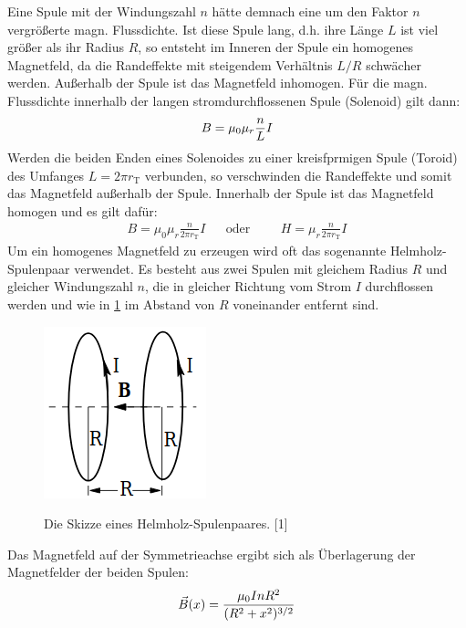 \documentclass[titlepage = firstcover]{scrartcl}
\begin{document}
      \FloatBarrier
      Eine Spule mit der Windungszahl $n$ hätte demnach eine um den Faktor $n$ vergrößerte magn. Flussdichte. Ist diese Spule lang, d.h. ihre Länge $L$ ist
      viel größer als ihr Radius $R$, so entsteht im Inneren der Spule ein homogenes Magnetfeld, da die Randeffekte mit steigendem Verhältnis $L/R$ schwächer
      werden. Außerhalb der Spule ist das Magnetfeld inhomogen. Für die magn. Flussdichte innerhalb der langen stromdurchflossenen Spule (Solenoid) gilt dann:
      \begin{equation}
        B = \mu_0 \mu_r \frac{n}{L} I \\
        \label{eqn:BFormel}
      \end{equation}
      Werden die beiden Enden eines Solenoides zu einer kreisfprmigen Spule (Toroid) des Umfanges $L = 2 \pi r_\text{T}$ verbunden, so verschwinden die Randeffekte und somit das Magnetfeld
      außerhalb der Spule. Innerhalb der Spule ist das Magnetfeld homogen und es gilt dafür:
      \begin{align}
        B = \mu_0 \mu_r \frac{n}{2 \pi r_\text{T}} I && \text{oder} &&& H = \mu_r \frac{n}{2 \pi r_\text{T}} I
      \end{align}
      Um ein homogenes Magnetfeld zu erzeugen wird oft das sogenannte Helmholz-Spulenpaar verwendet. Es besteht aus zwei Spulen mit gleichem Radius $R$ und
      gleicher Windungszahl $n$, die in gleicher Richtung vom Strom $I$ durchflossen werden und wie in \ref{fig:helmholz} im Abstand von $R$ voneinander entfernt sind.
      \begin{figure}[h]
        \centering
        \caption{Die Skizze eines Helmholz-Spulenpaares. [1]}
        \includegraphics[width = 0.25\linewidth]{Helmholzspulenpaar.png}
        \label{fig:helmholz}
      \end{figure}
      \FloatBarrier
      \noindent
      Das Magnetfeld auf der Symmetrieachse ergibt sich als Überlagerung der Magnetfelder der beiden Spulen:
      \begin{equation}
        \vec{B}(x) = \frac{\mu_0 I n R^2}{(R^2 + x^2)^{3/2}} \\
        \label{eqn:FormelHelm}
      \end{equation}
\end{document}
